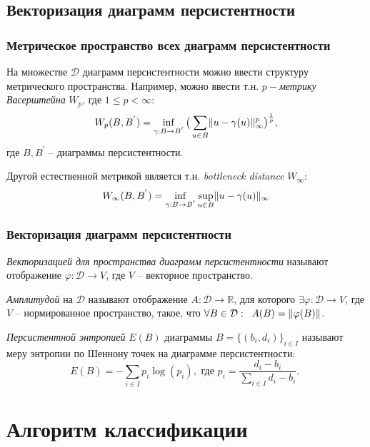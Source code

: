 \documentclass{beamer}
\DeclarePairedDelimiter\norm{\lVert}{\rVert}%
\begin{document}
		\subsection{Векторизация диаграмм персистентности}
		\begin{frame}
			\frametitle{Метрическое пространство всех диаграмм персистентности}
			На множестве $\mathcal{D}$ диаграмм персистентности можно ввести структуру метрического пространства. Например, можно ввести т.н. {\it $p-$метрику Васерштейна} $W_p$, где $1 \leq p < \infty$:
			\[
			W_p(B,B^{'}) = \inf\limits_{\gamma:B\to B^{'}} 
			\big( 
			\sum\limits_{u \in B} \norm{u - \gamma(u)}_\infty^p
			\big) ^{\frac{1}{p}},
			\]
			где $B, B^{'}$ -- диаграммы персистентности. 
			
			Другой естественной метрикой является т.н. {\it bottleneck distance} $W_\infty$:
			\[
				W_\infty(B, B^{'}) = \inf\limits_{\gamma:B\to B^{'}} \sup\limits_{u \in B}
										\norm{u - \gamma(u)}_\infty
			\]
		\end{frame}
		\begin{frame}
			\frametitle{Векторизация диаграмм персистентности}
			{\it Векторизацией для пространства диаграмм персистентности} называют отображение $ \varphi: \mathcal{D} \to V $, где $V$ -- векторное пространство. 
			
			{\it Амплитудой} на $\mathcal{D}$ называют отображение $A: \mathcal{D} \to \mathbb{R}$, для которого $\exists \varphi: \mathcal{D} \to V$, где $V$ -- нормированное пространство, такое, что $ \forall B \in \mathcal{D}: \;\; A(B) = \norm{\varphi(B)}$.
			
			{\it Персистентной энтропией} $E(B)$ диаграммы $B = \{ (b_i, d_i) \}_{i \in I}$ называют меру энтропии по Шеннону точек на диаграмме персистентности:
			\[
				E(B) = - \sum\limits_{i \in I} p_i \log(p_i), \text{ где $p_i = \dfrac{d_i - b_i}{\sum\limits_{i \in I}d_i-b_i}$. }
			\]
		\end{frame}
		\fi
	\section{Алгоритм классификации}
\end{document}
